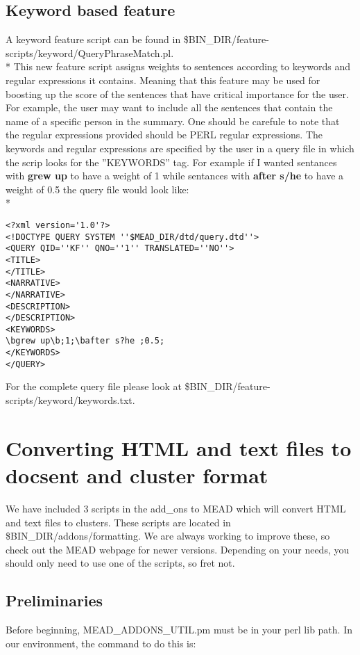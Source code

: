 \documentclass[10pt]{article}
\begin{document}
\subsection{Keyword based feature}
A keyword feature script can be found in \$BIN\_DIR/feature-scripts/keyword/QueryPhraseMatch.pl.\\*
This new feature script assigns weights to sentences according to keywords and regular expressions it contains.  
Meaning that this feature may be used for boosting up the score of the sentences that have critical importance for the user. 
For example, the user may want to include all the sentences that contain the name of a specific person in the summary.
One should be carefule to note that the regular expressions provided should be PERL regular expressions. 
The keywords and regular expressions are specified by the user in a query file in which the scrip looks for the ''KEYWORDS'' tag.
For example if I wanted sentances with {\bf grew up} to have a weight of 1 while sentances with {\bf after s/he} to have a weight of 0.5 the query file would look like:\\*
\begin{verbatim}
<?xml version='1.0'?>
<!DOCTYPE QUERY SYSTEM ''$MEAD_DIR/dtd/query.dtd''>
<QUERY QID=''KF'' QNO=''1'' TRANSLATED=''NO''>
<TITLE>
</TITLE>
<NARRATIVE>
</NARRATIVE>
<DESCRIPTION>
</DESCRIPTION>
<KEYWORDS>
\bgrew up\b;1;\bafter s?he ;0.5;
</KEYWORDS>
</QUERY>
\end{verbatim}
For the complete query file please look at \$BIN\_DIR/feature-scripts/keyword/keywords.txt.



\section{Converting HTML and text files to docsent and cluster format}

We have included 3 scripts in the add\_ons to MEAD which will convert HTML and 
text files to clusters.  These scripts are located in \$BIN\_DIR/addons/formatting. 
 We are always working to improve these, so check out the MEAD 
webpage for newer versions.  Depending on your needs, you should only need to use one of 
the scripts, so fret not.

\subsection{Preliminaries}
Before beginning, MEAD\_ADDONS\_UTIL.pm must be in your perl lib path.
In our environment, the command to do this is:
\end{document}
